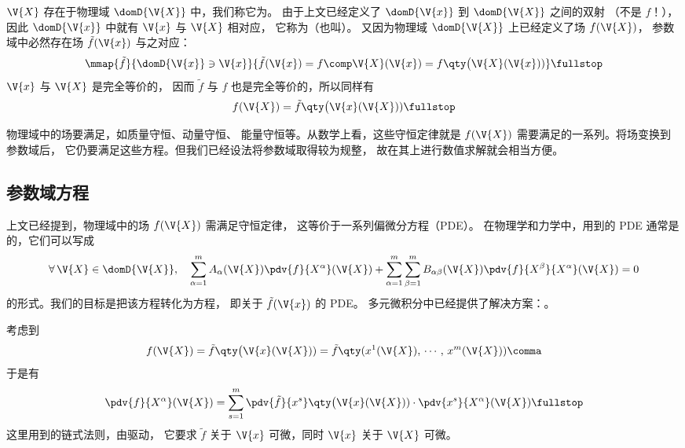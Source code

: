 $\V{X}$ 存在于物理域 $\domD{\V{X}}$ 中，我们称它为。
由于上文已经定义了 $\domD{\V{x}}$ 到 $\domD{\V{X}}$ 之间的双射
（不是 $f$！），因此 $\domD{\V{x}}$ 中就有
$\V{x}$ 与 $\V{X}$ 相对应，
它称为（也叫）。
又因为物理域 $\domD{\V{X}}$ 上已经定义了场 $f(\V{X})$，
参数域中必然存在场 $\tilde{f}(\V{x})$ 与之对应：
\begin{equation}
	\mmap{\tilde{f}}
		{\domD{\V{x}}\ni\V{x}}
		{\tilde{f}(\V{x})=f\comp\V{X}(\V{x})
			=f\qty\big(\V{X}(\V{x}))} \fullstop
\end{equation}
$\V{x}$ 与 $\V{X}$ 是完全等价的，
因而 $\tilde{f}$ 与 $f$ 也是完全等价的，所以同样有
\begin{equation}
	f(\V{X})=\tilde{f}\qty\big(\V{x}(\V{X})) \fullstop
\end{equation}

物理域中的场要满足，如质量守恒、动量守恒、
能量守恒等。从数学上看，这些守恒定律就是 $f(\V{X})$
需要满足的一系列。将场变换到参数域后，
它仍要满足这些方程。但我们已经设法将参数域取得较为规整，
故在其上进行数值求解就会相当方便。

\subsection{参数域方程} \label{subsec:参数域方程}
上文已经提到，物理域中的场 $f(\V{X})$ 需满足守恒定律，
这等价于一系列偏微分方程（PDE）。
在物理学和力学中，用到的 PDE 通常是的，它们可以写成
\begin{equation}
	\forall\,\V{X}\in\domD{\V{X}},\quad
	\sum_{\alpha=1}^{m} A_\alpha(\V{X}) \pdv{f}{X^\alpha} (\V{X})
	+\sum_{\alpha=1}^{m}\sum_{\beta=1}^{m}
		B_{\alpha\beta}(\V{X}) \pdv{f}{X^\beta}{X^\alpha} (\V{X}) = 0
\end{equation}
的形式。我们的目标是把该方程转化为方程，
即关于 $\tilde{f}(\V{x})$ 的 PDE。
多元微积分中已经提供了解决方案：。

考虑到
\begin{equation}
	f(\V{X})=\tilde{f}\qty\big(\V{x}(\V{X}))
	=\tilde{f}\qty(x^1(\V{X}),\,\cdots,\,x^m(\V{X})) \comma
\end{equation}
于是有
\begin{equation}
	\pdv{f}{X^\alpha} (\V{X})
	=\sum_{s=1}^{m} \pdv{\tilde{f}}{\displaystyle x^s}
		\qty\big(\V{x}(\V{X})) \cdot
		\pdv{x^s}{X^\alpha} (\V{X}) \fullstop
	\label{eq:参数域方程_一阶偏导项}
\end{equation}
这里用到的链式法则，由驱动，
它要求 $\tilde{f}$ 关于 $\V{x}$ 可微，同时 $\V{x}$ 关于
$\V{X}$ 可微。

